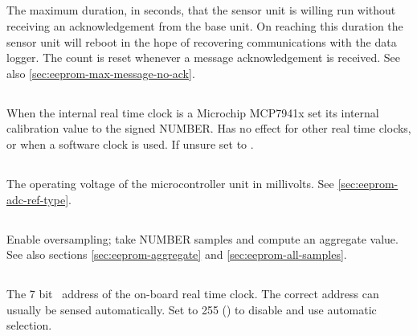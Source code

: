 \subsection[max-time-no-ack]{}
\label{sec:eeprom-max-time-no-ack}
The maximum duration, in seconds, that the sensor unit is willing run
without receiving an acknowledgement from the base unit. On reaching
this duration the sensor unit will reboot in the hope of recovering
communications with the data logger. The count is reset whenever a
message acknowledgement is received. See also
\ref{sec:eeprom-max-message-no-ack}.


\subsection[mcp7941x-cal]{}

When the internal real time clock is a Microchip MCP7941x set its internal
calibration value to the signed NUMBER. Has no effect for other real time
clocks, or when a software clock is used. If unsure set to .

\subsection[mcu-voltage-mv]{}
\label{sec:eeprom-mcu-voltage-mv}

The operating voltage of the microcontroller unit in millivolts. See
\ref{sec:eeprom-adc-ref-type}.

\subsection[num-samples]{}
\label{sec:eeprom-num-samples}

Enable oversampling; take NUMBER samples and compute an aggregate
value. See also sections \ref{sec:eeprom-aggregate} and
\ref{sec:eeprom-all-samples}.


\subsection[rtc-device-address]{}

The 7 bit \itwoc\ address of the on-board real time clock. The correct
address can usually be sensed automatically. Set to 255 ()
to disable and use automatic selection.

